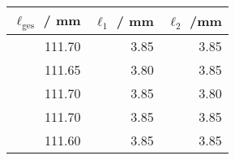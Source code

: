 \begin{tabular}{rrr}\\
 $\ell_\text{ges}$ / mm & $\ell_1$ / mm & $\ell_2$ /mm \\
 \hline
111.70 & 3.85 & 3.85\\
111.65 & 3.80 & 3.85\\
111.70 & 3.85 & 3.80\\
111.70 & 3.85 & 3.85\\
111.60 & 3.85 & 3.85
\end{tabular}